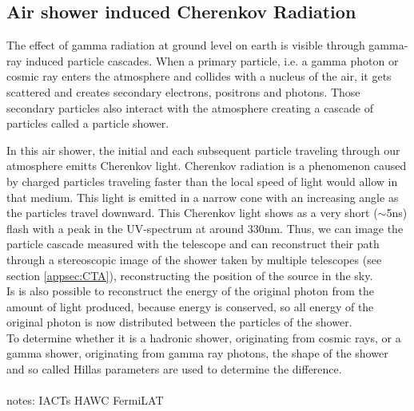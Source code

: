 \documentclass[12pt,article,type=msc,colorback,accentcolor=tud9c]{tudthesis}
\begin{document}
\subsection{Air shower induced Cherenkov Radiation}

\begin{wrapfigure}{R}{0.4\textwidth}
\centering
\texttt{[image: D:/OwnCloudData/00\_WriteUP/04\_Thesis/Pic/Proposal/Fig/\{gamma]}.jpg}
\caption{\label{fig:Cherenkov} The cone of Cherenkov light emitted by an extensive air shower. Picture from \cite{AsperaCTA}}
\end{wrapfigure}

The effect of gamma radiation at ground level on earth is visible through gamma-ray induced particle cascades. When a primary particle, i.e. a gamma photon or cosmic ray enters the atmosphere and collides with a nucleus of the air, it gets scattered and creates secondary electrons, positrons and photons. Those secondary particles also interact with the atmosphere creating a cascade of particles called a particle shower. 




In this air shower, the initial and each subsequent particle traveling through our atmosphere emitts Cherenkov light. Cherenkov radiation is a phenomenon caused by charged particles traveling faster than the local speed of light would allow in that medium. This light is emitted in a narrow cone with an increasing angle as the particles travel downward. This Cherenkov light shows as a very short ($\sim$5ns) flash with a peak in the UV-spectrum at around 330nm.
Thus, we can image the particle cascade measured with the telescope and can reconstruct their path through a stereoscopic image of the shower taken by multiple telescopes (see section {\ref{appsec:CTA}}), reconstructing the position of the source in the sky.\\

Is is also possible to reconstruct the energy of the original photon from the amount of light produced, because energy is conserved, so all energy of the original photon is now distributed between the particles of the shower.\\

To determine whether it is a hadronic shower, originating from cosmic rays, or a gamma shower, originating from gamma ray photons, the shape of the shower and so called Hillas parameters are used to determine the difference.
\\\\
notes:
IACTs
HAWC
FermiLAT
\end{document}
